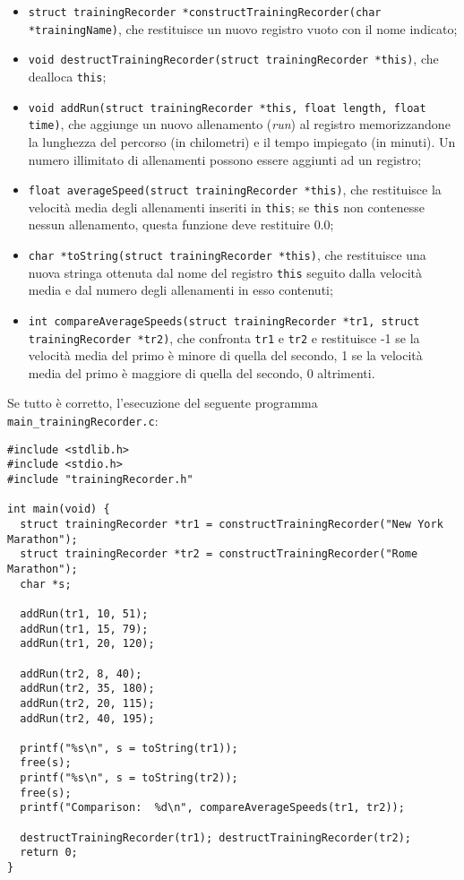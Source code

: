 \documentclass[12pt]{article}
\begin{document}
\begin{itemize}
\item \texttt{struct trainingRecorder *constructTrainingRecorder(char *trainingName)}, che resti\-tui\-sce un nuovo registro vuoto con il nome indicato;

\item \texttt{void destructTrainingRecorder(struct trainingRecorder *this)}, che dealloca \texttt{this};

\item \texttt{void addRun(struct trainingRecorder *this, float length, float time)},
      che aggiunge un nuovo allenamento (\emph{run}) al registro memorizzandone la lunghezza del percorso (in chilometri) e il tempo impiegato (in minuti). Un numero illimitato di allenamenti possono essere aggiunti ad un registro;

\item \texttt{float averageSpeed(struct trainingRecorder *this)}, che restituisce la velocit\`a media degli allenamenti inseriti in \texttt{this}; se \texttt{this} non contenesse nessun allenamento, questa funzione deve restituire $0.0$;

\item \texttt{char *toString(struct trainingRecorder *this)}, che restituisce una nuova stringa
      ottenuta dal nome del registro \texttt{this} seguito dalla velocit\`a media e dal numero degli allenamenti in esso contenuti;

\item \texttt{int compareAverageSpeeds(struct trainingRecorder *tr1, struct trainingRecorder *tr2)}, che confronta \texttt{tr1} e \texttt{tr2} e restituisce -1 se la velocit\`a media del primo \`e minore di quella del secondo, 1 se la velocit\`a media del primo \`e maggiore di quella del secondo, 0 altrimenti. 
\end{itemize}
%
Se tutto \`e corretto, l'esecuzione del seguente programma \texttt{main\_trainingRecorder.c}:

\begin{lstlisting}
#include <stdlib.h>
#include <stdio.h>
#include "trainingRecorder.h"

int main(void) {
  struct trainingRecorder *tr1 = constructTrainingRecorder("New York Marathon");
  struct trainingRecorder *tr2 = constructTrainingRecorder("Rome Marathon");
  char *s;

  addRun(tr1, 10, 51);
  addRun(tr1, 15, 79);
  addRun(tr1, 20, 120);

  addRun(tr2, 8, 40);
  addRun(tr2, 35, 180);
  addRun(tr2, 20, 115);
  addRun(tr2, 40, 195);

  printf("%s\n", s = toString(tr1));
  free(s);
  printf("%s\n", s = toString(tr2));
  free(s);
  printf("Comparison:  %d\n", compareAverageSpeeds(tr1, tr2));

  destructTrainingRecorder(tr1); destructTrainingRecorder(tr2);
  return 0;
}
\end{lstlisting}
\end{document}
